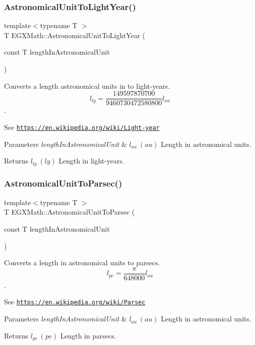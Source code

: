 \subsubsection{\texorpdfstring{Astronomical\+Unit\+To\+Light\+Year()}{AstronomicalUnitToLightYear()}}
{\footnotesize\ttfamily template$<$typename T $>$ \\
T E\+G\+X\+Math\+::\+Astronomical\+Unit\+To\+Light\+Year (\begin{DoxyParamCaption}\item[{const T}]{length\+In\+Astronomical\+Unit }\end{DoxyParamCaption})}



Converts a length astronomical units in to light-\/years. \[ l_{ly}= \frac{149597870700}{9460730472580800} l_{au} \]. 

See \href{https://en.wikipedia.org/wiki/Light-year}{\tt https\+://en.\+wikipedia.\+org/wiki/\+Light-\/year} 
\begin{DoxyParams}{Parameters}
{\em length\+In\+Astronomical\+Unit} & $ l_{au}\ (au)$ Length in astronomical units. \\
\hline
\end{DoxyParams}
\begin{DoxyReturn}{Returns}
$ l_{ly}\ (ly)$ Length in light-\/years. 
\end{DoxyReturn}
\mbox{\label{group___e_g_x_math-_conversions-_length_conversions-_astronomical-_astronomical_unit-_astronomical_gabcd5dd0effb649f31e9e4e3091679cdd}} 
\subsubsection{\texorpdfstring{Astronomical\+Unit\+To\+Parsec()}{AstronomicalUnitToParsec()}}
{\footnotesize\ttfamily template$<$typename T $>$ \\
T E\+G\+X\+Math\+::\+Astronomical\+Unit\+To\+Parsec (\begin{DoxyParamCaption}\item[{const T}]{length\+In\+Astronomical\+Unit }\end{DoxyParamCaption})}



Converts a length in astronomical units to parsecs. \[ l_{pc}=\frac{\pi}{648000} l_{au} \]. 

See \href{https://en.wikipedia.org/wiki/Parsec}{\tt https\+://en.\+wikipedia.\+org/wiki/\+Parsec} 
\begin{DoxyParams}{Parameters}
{\em length\+In\+Astronomical\+Unit} & $ l_{au}\ (au)$ Length in astronomical units. \\
\hline
\end{DoxyParams}
\begin{DoxyReturn}{Returns}
$ l_{pc}\ (pc)$ Length in parsecs. 
\end{DoxyReturn}
